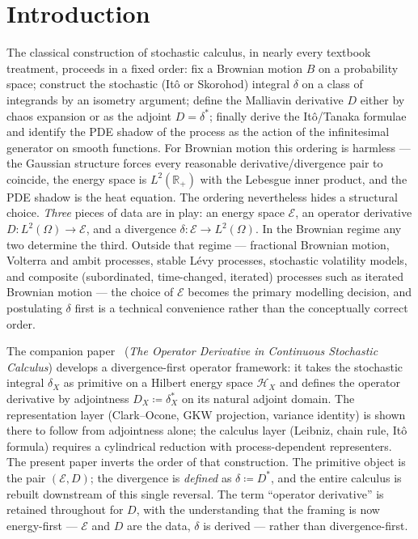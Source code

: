 \documentclass[11pt,reqno]{amsart}
\theoremstyle{plain}
\theoremstyle{definition}
\theoremstyle{remark}
\newcommand{\R}{\mathbb{R}}
\newcommand{\Energy}{\mathcal{E}}
\begin{document}
\maketitle

\section{Introduction}\label{sec:intro}

The classical construction of stochastic calculus, in nearly every
textbook treatment, proceeds in a fixed order: fix a Brownian motion
$B$ on a probability space; construct the stochastic (It\^o or
Skorohod) integral $\delta$ on a class of integrands by an isometry
argument; define the Malliavin derivative $D$ either by chaos
expansion or as the adjoint $D=\delta^{*}$; finally derive the
It\^o/Tanaka formulae and identify the PDE shadow of the process as
the action of the infinitesimal generator on smooth functions. For
Brownian motion this ordering is harmless --- the Gaussian structure
forces every reasonable derivative/divergence pair to coincide, the
energy space is $L^{2}(\R_{+})$ with the Lebesgue inner product, and
the PDE shadow is the heat equation. The ordering nevertheless hides
a structural choice. \emph{Three} pieces of data are in play: an
energy space $\Energy$, an operator derivative
$D\colon L^{2}(\Omega)\to\Energy$, and a divergence
$\delta\colon\Energy\to L^{2}(\Omega)$. In the Brownian regime any two
determine the third. Outside that regime --- fractional Brownian
motion, Volterra and ambit processes, stable L\'evy processes,
stochastic volatility models, and composite (subordinated,
time-changed, iterated) processes such as iterated Brownian motion ---
the choice of $\Energy$ becomes the primary modelling decision, and
postulating $\delta$ first is a technical convenience rather than the
conceptually correct order.

The companion paper~\cite{Fontes-OperatorDerivative} (\emph{The
Operator Derivative in Continuous Stochastic Calculus}) develops a
divergence-first operator framework: it takes the stochastic integral
$\delta_X$ as primitive on a Hilbert energy space $\mathcal H_X$ and
defines the operator derivative by adjointness
$D_X\coloneqq\delta_X^{*}$ on its natural adjoint domain. The
representation layer (Clark--Ocone, GKW projection, variance
identity) is shown there to follow from adjointness alone; the
calculus layer (Leibniz, chain rule, It\^o formula) requires a
cylindrical reduction with process-dependent representers. The
present paper inverts the order of that construction. The primitive
object is the pair $(\Energy, D)$; the divergence is
\emph{defined} as $\delta\coloneqq D^{*}$, and the entire calculus is
rebuilt downstream of this single reversal. The term ``operator
derivative'' is retained throughout for $D$, with the understanding
that the framing is now energy-first --- $\Energy$ and $D$ are the
data, $\delta$ is derived --- rather than divergence-first.
\end{document}
